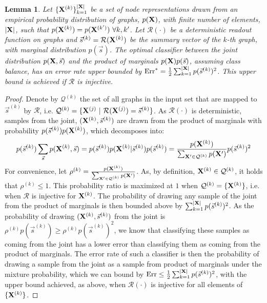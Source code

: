 \documentclass{article} \usepackage{iclr2019_conference,times}
\newtheorem{lemma}{Lemma}
\begin{document}
\begin{lemma}
Let $\{{\bf X}^{(k)}\}_{k = 1}^{|{\bf X}|}$ be a set of node representations drawn from an empirical probability distribution of graphs, $p({\bf X})$, with finite number of elements, $|{\bf X}|$, such that $p({\bf X}^{(k)}) = p({\bf X}^{(k')}) \ \forall k, k'$.
Let $\mathcal{R}(\cdot)$ be a deterministic readout function on graphs and $\vec{s}^{(k)} = \mathcal{R}({\bf X}^{(k)})$ be the summary vector of the $k$-th graph, with marginal distribution $p(\vec{s})$.
The optimal classifier between the joint distribution $p({\bf X}, \vec{s})$ and the product of marginals $p({\bf X})p(\vec{s})$, assuming class balance, has an error rate upper bounded by $\mathrm{Err}^* = \frac{1}{2} \sum_{k=1}^{|{\bf X}|} p(\vec{s}^{(k)})^2$. This upper bound is achieved if $\mathcal{R}$ is injective.
\label{lemma}
\end{lemma}
\begin{proof}
Denote by $\mathcal{Q}^{(k)}$ the set of all graphs in the input set that are mapped to $\vec{s}^{(k)}$ by $\mathcal{R}$, i.e. $\mathcal{Q}^{(k)} = \{{\bf X}^{(j)}\ |\ \mathcal{R}({\bf X}^{(j)}) = \vec{s}^{(k)}\}$. As $\mathcal{R}(\cdot)$ is deterministic, samples from the joint, $({\bf X}^{(k)}, \vec{s}^{(k)})$ are drawn from the product of marginals with probability $p(\vec{s}^{(k)}) p({\bf X}^{(k)})$, which decomposes into:
\begin{equation}
p(\vec{s}^{(k)}) \sum_{\vec{s}} p({\bf X}^{(k)}, \vec{s}) = p(\vec{s}^{(k)})p({\bf X}^{(k)}|\vec{s}^{(k)})p(\vec{s}^{(k)}) = \frac{p({\bf X}^{(k)})}{\sum_{{\bf X'}\in\mathcal{Q}^{(k)}} p({\bf X'})} p(\vec{s}^{(k)})^2
\end{equation}
For convenience, let $\rho^{(k)} = \frac{p({\bf X}^{(k)})}{\sum_{{\bf X'}\in\mathcal{Q}^{(k)}} p({\bf X'})}$. As, by definition, ${\bf X}^{(k)}\in\mathcal{Q}^{(k)}$, it holds that $\rho^{(k)} \leq 1$. This probability ratio is maximized at $1$ when $\mathcal{Q}^{(k)} = \{{\bf X}^{(k)}\}$, i.e. when $\mathcal{R}$ is injective for ${\bf X}^{(k)}$.
The probability of drawing any sample of the joint from the product of marginals is then bounded above by $\sum_{k=1}^{|{\bf X}|} p(\vec{s}^{(k)})^2$. 
As the probability of drawing $({\bf X}^{(k)}, \vec{s}^{(k)})$ from the joint is $\rho^{(k)}p(\vec{s}^{(k)}) \geq \rho^{(k)}p(\vec{s}^{(k)})^2$, we know that classifying these samples as coming from the joint has a lower error than classifying them as coming from the product of marginals.
The error rate of such a classifier is then the probability of drawing a sample from the joint as a sample from product of marginals under the mixture probability, which we can bound by $\mathrm{Err} \leq \frac{1}{2} \sum_{k=1}^{|{\bf X}|} p(\vec{s}^{(k)})^2$, with the upper bound achieved, as above, when $\mathcal{R}(\cdot)$ is injective for all elements of $\{{\bf X}^{(k)}\}$.
\end{proof}
\end{document}

